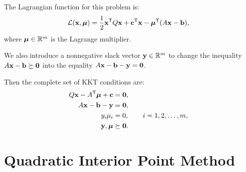 The Lagrangian function for this problem is:
\begin{align}
\mathcal{L}(\mathbf{x},\boldsymbol{\mu}) = \frac{1}{2}\mathbf{x}^{\mathsf T} Q\mathbf{x} + \mathbf{c}^{\mathsf T} \mathbf{x} - \boldsymbol{\mu}^{\mathsf T} (A\mathbf{x} -\mathbf{b}),
\label{eq:lagrangian}
\end{align}
where $\boldsymbol{\mu} \in \mathbb{R}^m$ is the Lagrange multiplier.

\begin{comment} %
We next take the gradient of the Lagrangian with respect to $x$ and set it equal to zero:
\begin{align*}
0 &= \nabla_x \mathcal{L}(x,\lambda)\\
&= Qx + c - A\trp \lambda.
\end{align*}
We next write the complementary slackness condition:
\[
(Ax - b)_i\lambda_i = 0, \qquad i=1,2,\ldots,m.
\]
We finish by listing the inequality constraints as well as the nonnegativity constraint for $\lambda$:
\begin{align*}
Ax - b &\geq 0,\\
\lambda &\geq 0.
\end{align*}
\end{comment} %

We also introduce a nonnegative slack vector $\mathbf{y}\in\mathbb{R}^m$ to change the inequality
$A\mathbf{x} - \mathbf{b} \succeq \mathbf{0}$ into the equality $A\mathbf{x} - \mathbf{b} - \mathbf{y} = \mathbf{0}$.

\begin{comment}
\begin{align}
A\x - \b - \y = \0 &&\Longrightarrow &&\y = A\x - \b
\label{eq:equality}
\end{align}
\end{comment}

Then the complete set of KKT conditions are:
\begin{align*}
Q\mathbf{x} - A^{\mathsf T} \boldsymbol{\mu} + \mathbf{c} &= \mathbf{0},\\
A\mathbf{x} - \mathbf{b} - \mathbf{y} &= \mathbf{0},\\
y_i\mu_i &= 0, \qquad i=1,2,\ldots,m,\\
\mathbf{y},\boldsymbol{\mu} &\succeq \mathbf{0}.
\end{align*}

\section*{Quadratic Interior Point Method}

